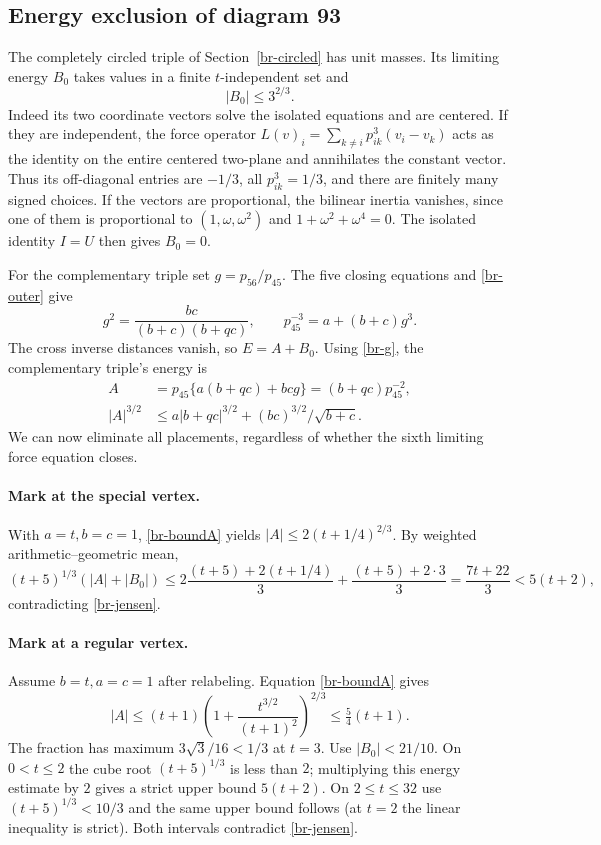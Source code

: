 \documentclass[11pt,letterpaper]{article}
\theoremstyle{definition}
\begin{document}
\subsection{Energy exclusion of diagram 93}
The completely circled triple of Section~\ref{br-circled} has unit
masses. Its limiting energy $B_0$ takes values in a finite
$t$-independent set and
\begin{equation}\label{br-boundB}|B_0|\le3^{2/3}.\end{equation}
Indeed its two coordinate vectors solve the isolated equations and
are centered. If they are independent, the force operator
$L(v)_i=\sum_{k\ne i}p_{ik}^3(v_i-v_k)$ acts as the identity on
the entire centered two-plane and annihilates the constant vector.
Thus its off-diagonal entries are $-1/3$, all $p_{ik}^3=1/3$,
and there are finitely many signed choices. If the vectors are
proportional, the bilinear inertia vanishes, since one of them
is proportional to $(1,\omega,\omega^2)$ and
$1+\omega^2+\omega^4=0$. The isolated identity $I=U$ then gives $B_0=0$.

For the complementary triple set $g=p_{56}/p_{45}$.
The five closing equations and \eqref{br-outer} give
\begin{equation}\label{br-g}
 g^2=\frac{bc}{(b+c)(b+qc)},\qquad
 p_{45}^{-3}=a+(b+c)g^3.
\end{equation}
The cross inverse distances vanish, so $E=A+B_0$. Using \eqref{br-g},
the complementary triple's energy is
\begin{align}
 A&=p_{45}\{a(b+qc)+bcg\}=(b+qc)p_{45}^{-2},\label{br-A}\\
 |A|^{3/2}&\le a|b+qc|^{3/2}+(bc)^{3/2}/\sqrt{b+c}.\label{br-boundA}
\end{align}
We can now eliminate all placements, regardless of whether the
sixth limiting force equation closes.

\paragraph{Mark at the special vertex.}
With $a=t,b=c=1$, \eqref{br-boundA} yields
$|A|\le2(t+1/4)^{2/3}$. By weighted arithmetic--geometric mean,
\[
 (t+5)^{1/3}(|A|+|B_0|)
 \le 2\frac{(t+5)+2(t+1/4)}3+\frac{(t+5)+2\cdot3}3
 =\frac{7t+22}{3}<5(t+2),
\]
contradicting \eqref{br-jensen}.

\paragraph{Mark at a regular vertex.}
Assume $b=t,a=c=1$ after relabeling. Equation \eqref{br-boundA} gives
\[
 |A|\le(t+1)\left(1+\frac{t^{3/2}}{(t+1)^2}\right)^{2/3}
 \le\tfrac54(t+1).
\]
The fraction has maximum $3\sqrt3/16<1/3$ at $t=3$.
Use $|B_0|<21/10$. On $0<t\le2$ the cube root $(t+5)^{1/3}$ is
less than $2$; multiplying this energy estimate by $2$ gives
a strict upper bound $5(t+2)$. On $2\le t\le32$ use
$(t+5)^{1/3}<10/3$ and the same upper bound follows (at $t=2$
the linear inequality is strict). Both intervals contradict
\eqref{br-jensen}.
\end{document}
